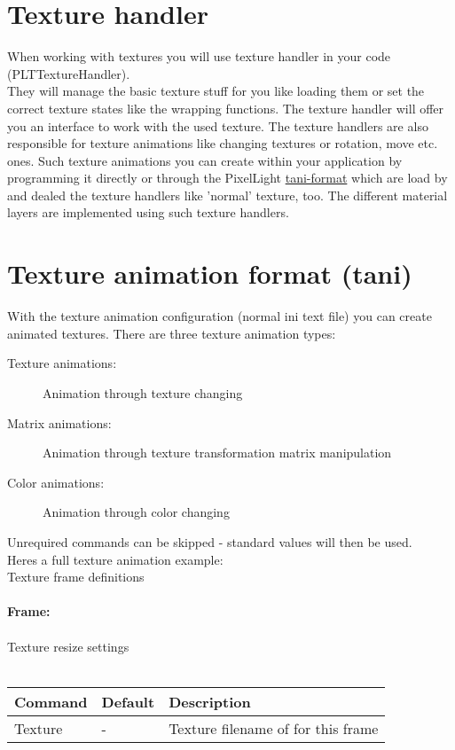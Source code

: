 \section{Texture handler}
When working with textures you will use texture handler in your code (PLTTextureHandler).\\
They will manage the basic texture stuff for you like loading them or set the correct texture states
like the wrapping functions. The texture handler will offer you an interface to work with the used texture.
The texture handlers are also responsible for texture animations like changing textures or rotation, move etc.
ones. Such texture animations you can create within your application by programming it directly
or through the PixelLight \hyperlink{tani}{tani-format} which are load by and dealed the texture
handlers like 'normal' texture, too.
The different material layers are implemented using such texture handlers.




\section{Texture animation format (tani)}
\hypertarget{tani}{}
With the texture animation configuration (normal ini text file) you can create animated textures.
There are three texture animation types:
\begin{description}
\item[Texture animations:] Animation through texture changing
\item[Matrix animations:]  Animation through texture transformation matrix manipulation
\item[Color animations:]   Animation through color changing
\end{description}
Unrequired commands can be skipped - standard values will then be used.\\

Heres a full texture animation example:\\



Texture frame definitions\\
\\
\textbf{Frame:}\\
\\
Texture resize settings\\
\\
\begin{tabular}{|p{2.5cm}|p{2.5cm}|p{9cm}|}
\hline
\textbf{Command} & \textbf{Default} & \textbf{Description}\\
\hline
Texture & - & Texture filename of for this frame\\
\hline
\end{tabular}


